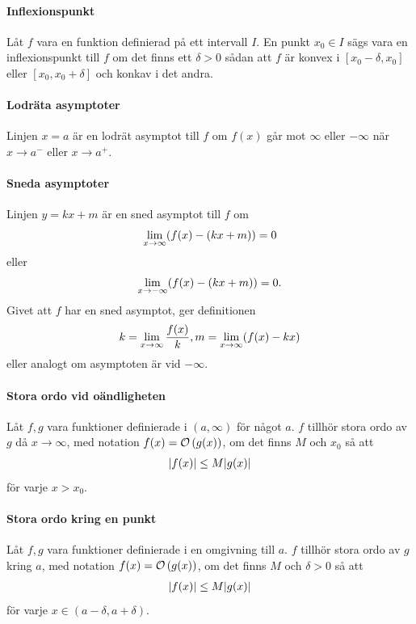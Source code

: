 \paragraph{Inflexionspunkt}
Låt $f$ vara en funktion definierad på ett intervall $I$. En punkt $x_0\in I$ sägs vara en inflexionspunkt till $f$ om det finns ett $\delta > 0$ sådan att $f$ är konvex i $[x_0 - \delta, x_0]$ eller $[x_0, x_0 + \delta]$ och konkav i det andra.

\paragraph{Lodräta asymptoter}
Linjen $x = a$ är en lodrät asymptot till $f$ om $f(x)$ går mot $\infty$ eller $-\infty$ när $x\to a^{-}$ eller $x\to a^{+}$.

\paragraph{Sneda asymptoter}
Linjen $y = kx + m$ är en sned asymptot till $f$ om
\begin{align*}
	\lim\limits_{x\to \infty}(f(x) - (kx + m)) = 0
\end{align*}
eller
\begin{align*}
	\lim\limits_{x\to -\infty}(f(x) - (kx + m)) = 0.
\end{align*}
Givet att $f$ har en sned asymptot, ger definitionen
\begin{align*}
	k = \lim\limits_{x\to \infty}\frac{f(x)}{k}, m = \lim\limits_{x\to \infty}(f(x) - kx)
\end{align*}
eller analogt om asymptoten är vid $-\infty$.

\paragraph{Stora ordo vid oändligheten}
Låt $f, g$ vara funktioner definierade i $(a, \infty)$ för något $a$. $f$ tillhör stora ordo av $g$ då $x\to\infty$, med notation $f(x) = \mathcal{O}\left(g(x)\right)$, om det finns $M$ och $x_0$ så att
\begin{align*}
	\abs{f(x)}\leq M\abs{g(x)}
\end{align*}
för varje $x > x_0$.

\paragraph{Stora ordo kring en punkt}
Låt $f, g$ vara funktioner definierade i en omgivning till $a$. $f$ tillhör stora ordo av $g$ kring $a$, med notation $f(x) = \mathcal{O}\left(g(x)\right)$, om det finns $M$ och $\delta > 0$ så att
\begin{align*}
	\abs{f(x)}\leq M\abs{g(x)}
\end{align*}
för varje $x\in(a - \delta, a + \delta)$.


